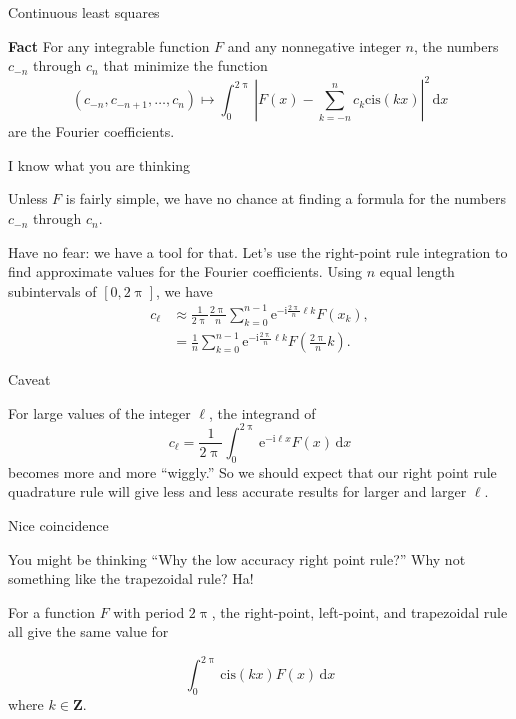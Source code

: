 \documentclass[portrait,fleqn,12pt]{beamer}
\newcommand{\integers}{\mathbf{Z}}
\newcommand{\cis}{\mathrm{cis}}
\newcommand{\euler}{\mathrm{e}}
\newcommand{\imag}{\mathrm{i}}
\begin{document}
 \begin{frame}{Continuous least squares }

  \textbf{Fact} For any integrable function $F$ and any nonnegative integer $n$,
  the numbers $c_{-n}$ through $c_n$ that minimize the function
  \begin{equation*}
     (c_{-n}, c_{-n+1}, \dots, c_n) \mapsto 
       \int_0^{2 \uppi} \left |F(x) - \sum_{k=-n}^n c_k \cis(k x) \right |^2 
        \, \mathrm{d} x 
  \end{equation*}
  are the Fourier coefficients.
 \end{frame}


 
 \begin{frame}{I know what you are thinking}
 
 Unless $F$ is fairly simple, we have no chance at finding a formula for the numbers $c_{-n}$ through $c_n$.  
 
 Have no fear: we have
 a tool for that.  Let's use the right-point rule integration to find approximate values for the Fourier coefficients. Using $n$ equal length 
 subintervals of $[0, 2 \uppi]$, we have
\begin{align*}
  c_\ell &\approx \frac{1}{2 \uppi}  \frac{2 \uppi}{n} \sum_{k=0}^{n-1}  \euler^{-  \imag \frac{2 \uppi}{n}  \ell  k} F(x_k), \\
            &=  \frac{1}{n} \sum_{k=0}^{n-1}  \euler^{-  \imag \frac{2 \uppi}{n}  \ell  k} F \left (\frac{2 \uppi}{n} k \right).
\end{align*}
 
  \end{frame}
  
  \begin{frame}{Caveat}
  
  For large values of the integer $\ell$, the integrand of
  \begin{equation*}
   c_\ell = \frac{1}{2 \uppi} \int_0^{2 \uppi} \euler^{-\imag  \ell x} F(x) \, \mathrm{d}x
\end{equation*}
becomes more and more ``wiggly.''  So we should expect that our right point rule quadrature rule will give less and less 
accurate results for larger and larger $\ell$.
  
  \vfill
  
  
  \end{frame}
  
  \begin{frame}{Nice coincidence}
  
  You might be thinking ``Why the low accuracy right point rule?'' Why not something like the trapezoidal rule?  Ha!
  
  For a function $F$ with period $2 \uppi$, the right-point, left-point, and trapezoidal rule all give the same value for
  
  \begin{equation}
     \int_0^{2 \uppi} \cis(k x) F(x) \, \mathrm{d} x
  \end{equation}
  where $k \in \integers$.
  
  \end{frame}
  
\end{document}
